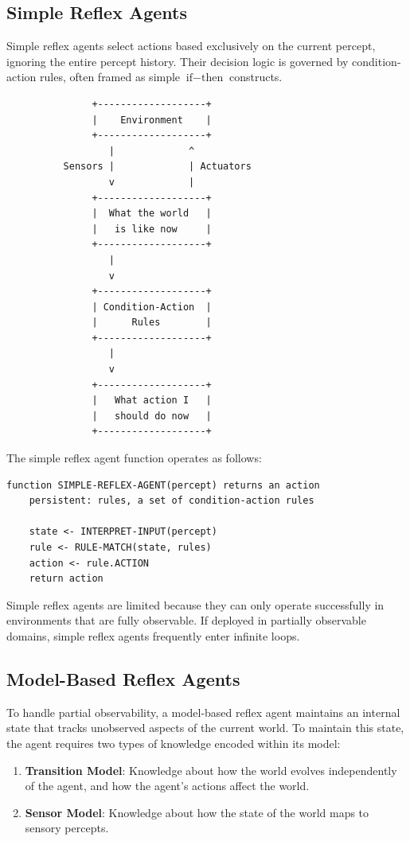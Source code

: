 \documentclass[12pt]{report}
\begin{document}
\subsection{Simple Reflex Agents}

Simple reflex agents select actions based exclusively on the current percept, ignoring the entire percept history. Their decision logic is governed by condition-action rules, often framed as simple $\text{if}-\text{then}$ constructs.

\begin{verbatim}
               +-------------------+
               |    Environment    |
               +-------------------+
                  |             ^
          Sensors |             | Actuators
                  v             |
               +-------------------+
               |  What the world   |
               |   is like now     |
               +-------------------+
                  |
                  v
               +-------------------+
               | Condition-Action  |
               |      Rules        |
               +-------------------+
                  |
                  v
               +-------------------+
               |   What action I   |
               |   should do now   |
               +-------------------+
\end{verbatim}

The simple reflex agent function operates as follows:
\begin{verbatim}
function SIMPLE-REFLEX-AGENT(percept) returns an action
    persistent: rules, a set of condition-action rules

    state <- INTERPRET-INPUT(percept)
    rule <- RULE-MATCH(state, rules)
    action <- rule.ACTION
    return action
\end{verbatim}

Simple reflex agents are limited because they can only operate successfully in environments that are fully observable. If deployed in partially observable domains, simple reflex agents frequently enter infinite loops.

\subsection{Model-Based Reflex Agents}

To handle partial observability, a model-based reflex agent maintains an internal state that tracks unobserved aspects of the current world. To maintain this state, the agent requires two types of knowledge encoded within its model:
\begin{enumerate}
    \item \textbf{Transition Model}: Knowledge about how the world evolves independently of the agent, and how the agent's actions affect the world.
    \item \textbf{Sensor Model}: Knowledge about how the state of the world maps to sensory percepts.
\end{enumerate}
\end{document}
